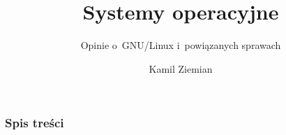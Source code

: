 \documentclass[10pt,t]{beamer}
\title{Systemy operacyjne}
\subtitle{Opinie o~GNU/Linux i~powiązanych sprawach}
\author{Kamil Ziemian}
\begin{document}





\RaggedRight





\maketitle





\begin{frame}
  \frametitle{Spis treści}


  \tableofcontents

\end{frame}































\end{document}

